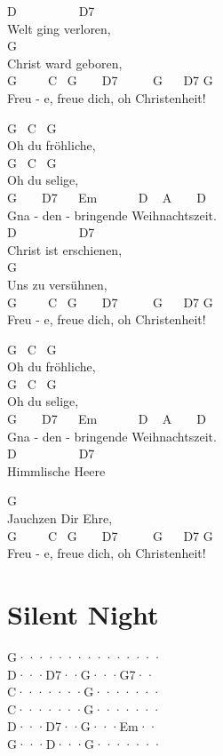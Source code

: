 \documentclass[
  letterpaper,
  twoside=false]{scrbook}
\begin{document}
D ~ ~ ~ ~ ~ ~D7\\
Welt ging verloren,\\
G\\
Christ ward geboren,\\
G ~ ~ ~C ~G ~ ~ D7 ~ ~ ~ G ~ ~D7 G\\
Freu - e, freue dich, oh Christenheit!

G ~C ~G\\
Oh du fröhliche,\\
G ~C ~G\\
Oh du selige,\\
G ~ ~ D7 ~ ~Em ~ ~ ~ ~D ~ A ~ ~ D\\
Gna - den - bringende Weihnachtszeit.\\
D ~ ~ ~ ~ ~ ~D7\\
Christ ist erschienen,\\
G\\
Uns zu versühnen,\\
G ~ ~ ~C ~G ~ ~ D7 ~ ~ ~ G ~ ~D7 G\\
Freu - e, freue dich, oh Christenheit!

G ~C ~G\\
Oh du fröhliche,\\
G ~C ~G\\
Oh du selige,\\
G ~ ~ D7 ~ ~Em ~ ~ ~ ~D ~ A ~ ~ D\\
Gna - den - bringende Weihnachtszeit.\\
D ~ ~ ~ ~ ~ ~D7\\
Himmlische Heere

G\\
Jauchzen Dir Ehre,\\
G ~ ~ ~C ~G ~ ~ D7 ~ ~ ~ G ~ ~D7 G\\
Freu - e, freue dich, oh Christenheit!

\hypertarget{silent-night}{%
\chapter{Silent Night}\label{silent-night}}

G···\textbar····\textbar····\textbar····\textbar{}\\
D···\textbar D7··\textbar G···\textbar G7··\textbar{}\\
C···\textbar····\textbar G···\textbar····\textbar{}\\
C···\textbar····\textbar G···\textbar····\textbar{}\\
D···\textbar D7··\textbar G···\textbar Em··\textbar{}\\
G···\textbar D···\textbar G···\textbar····\textbar{}
\end{document}
